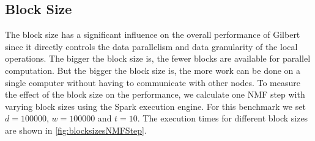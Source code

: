 \subsection{Block Size}

The block size has a significant influence on the overall performance of Gilbert since it directly controls the data parallelism and data granularity of the local operations.
The bigger the block size is, the fewer blocks are available for parallel computation.
But the bigger the block size is, the more work can be done on a single computer without having to communicate with other nodes.
To measure the effect of the block size on the performance, we calculate one NMF step with varying block sizes using the Spark execution engine.
For this benchmark we set $d=100000$, $w = 100000$ and $t = 10$.
The execution times for different block sizes are shown in \cref{fig:blocksizesNMFStep}.

